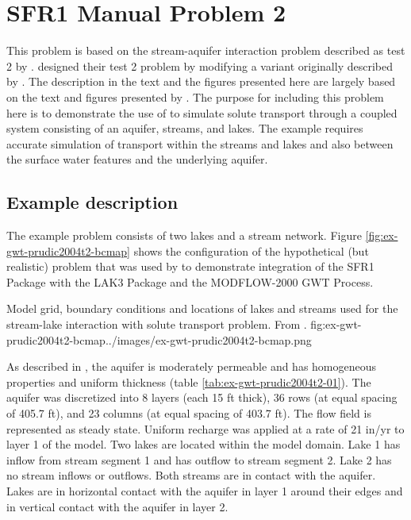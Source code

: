 \section{SFR1 Manual Problem 2}

This problem is based on the stream-aquifer interaction problem described as test 2 by \cite{modflowsfr1pack}.  \cite{modflowsfr1pack} designed their test 2 problem by modifying a variant originally described by \cite{modflowlak3pack}.  The description in the text and the figures presented here are largely based on the text and figures presented by \cite{modflowsfr1pack}.  The purpose for including this problem here is to demonstrate the use of \mf to simulate solute transport through a coupled system consisting of an aquifer, streams, and lakes.  The example requires accurate simulation of transport within the streams and lakes and also between the surface water features and the underlying aquifer.  

\subsection{Example description}

The example problem consists of two lakes and a stream network.  Figure \ref{fig:ex-gwt-prudic2004t2-bcmap} shows the configuration of the hypothetical (but realistic) problem that was used by \cite{modflowsfr1pack} to demonstrate integration of the SFR1 Package with the LAK3 Package and the MODFLOW-2000 GWT Process.  

\begin{StandardFigure}{
                                     Model grid, boundary conditions and locations of lakes and streams used for the stream-lake interaction with solute transport problem.  From  \cite{modflowsfr1pack}.
                                     }{fig:ex-gwt-prudic2004t2-bcmap}{../images/ex-gwt-prudic2004t2-bcmap.png}
\end{StandardFigure}            

As described in \cite{modflowsfr1pack}, the aquifer is moderately permeable and has homogeneous properties and uniform thickness (table \ref{tab:ex-gwt-prudic2004t2-01}).  The aquifer was discretized into 8 layers (each 15 ft thick), 36 rows (at equal spacing of 405.7 ft), and 23 columns (at equal spacing of 403.7 ft).  The flow field is represented as steady state.  Uniform recharge was applied at a rate of 21 in/yr to layer 1 of the model.  Two lakes are located within the model domain.  Lake 1 has inflow from stream segment 1 and has outflow to stream segment 2.  Lake 2 has no stream inflows or outflows.  Both streams are in contact with the aquifer.  Lakes are in horizontal contact with the aquifer in layer 1 around their edges and in vertical contact with the aquifer in layer 2.

